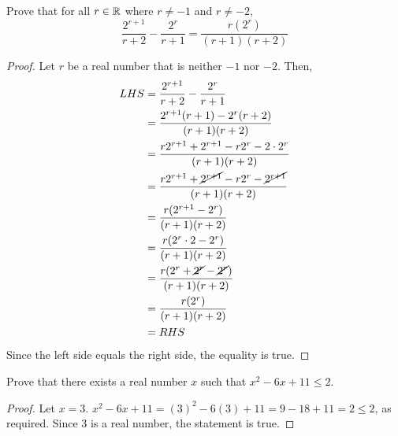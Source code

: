 \question Prove that for all $r\in\mathbb{R}$ where $r\neq -1$ and $r\neq -2$,
\begin{equation*}
  \frac{2^{r+1}}{r+2}-\frac{2^r}{r+1}=\frac{r(2^r)}{(r+1)(r+2)}
\end{equation*}
\begin{proof}
  Let $r$ be a real number that is neither $-1$ nor $-2$.
  Then,
  \begin{align*}
    LHS & = \frac{2^{r+1}}{r+2}-\frac{2^r}{r+1}                                      \\
        & = \frac{2^{r+1}(r+1) - 2^r(r+2)}{(r+1)(r+2)}                               \\
        & = \frac{r2^{r+1} + 2^{r+1} - r2^r - 2\cdot 2^r}{(r+1)(r+2)}                \\
        & = \frac{r2^{r+1} + \cancel{2^{r+1}} - r2^r - \cancel{2^{r+1}}}{(r+1)(r+2)} \\
        & = \frac{r(2^{r+1} - 2^r)}{(r+1)(r+2)}                                      \\
        & = \frac{r(2^r\cdot 2 - 2^r)}{(r+1)(r+2)}                                   \\
        & = \frac{r(2^r + \cancel{2^r} - \cancel{2^r})}{(r+1)(r+2)}                  \\
        & = \frac{r(2^r)}{(r+1)(r+2)}                                                \\
        & = RHS
  \end{align*}
  Since the left side equals the right side, the equality is true.
\end{proof}


\question Prove that there exists a real number $x$ such that $x^2 - 6x + 11 \leq 2$.
\begin{proof}
  Let $x=3$.
  $x^2-6x+11=(3)^2-6(3)+11=9-18+11=2 \leq 2$, as required.
  Since 3 is a real number, the statement is true.
\end{proof}


